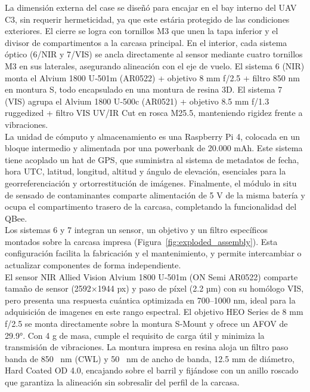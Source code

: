     \noindent La dimensión externa del case se diseñó para encajar en el bay interno del UAV C3, sin requerir hermeticidad, ya que este estária protegido de las condiciones exteriores. El cierre se logra con tornillos M3 que unen la tapa inferior y el divisor de compartimentos a la carcasa principal. En el interior, cada sistema óptico (6/NIR y 7/VIS) se ancla directamente al sensor mediante cuatro tornillos M3 en sus laterales, asegurando alineación con el eje de vuelo. El sistema 6 (NIR) monta el Alvium 1800 U‑501m (AR0522) + objetivo 8 mm f/2.5 + filtro 850 nm en montura S, todo encapsulado en una montura de resina 3D. El sistema 7 (VIS) agrupa el Alvium 1800 U‑500c (AR0521) + objetivo 8.5 mm f/1.3 ruggedized + filtro VIS UV/IR Cut en rosca M25.5, manteniendo rigidez frente a vibraciones.\\
    
    \noindent La unidad de cómputo y almacenamiento es una Raspberry Pi 4, colocada en un bloque intermedio y alimentada por una powerbank de 20.000 mAh. Este sistema tiene acoplado un hat de GPS, que suministra al sistema de metadatos de fecha, hora UTC, latitud, longitud, altitud y ángulo de elevación, esenciales para la georreferenciación y ortorrestitución de imágenes. Finalmente, el módulo in situ de sensado de contaminantes comparte alimentación de 5 V de la misma batería y ocupa el compartimento trasero de la carcasa, completando la funcionalidad del QBee.\\
    
    



    \noindent Los sistemas 6 y 7 integran un sensor, un objetivo y un filtro específicos montados sobre la carcasa impresa (Figura~\ref{fig:exploded_assembly}). Esta configuración facilita la fabricación y el mantenimiento, y permite intercambiar o actualizar componentes de forma independiente.\\

    \noindent El sensor NIR Allied Vision Alvium 1800 U‑501m (ON Semi AR0522) comparte tamaño de sensor (2592×1944 px) y paso de píxel (2.2 µm) con su homólogo VIS, pero presenta una respuesta cuántica optimizada en 700–1000 nm, ideal para la adquisición de imagenes en este rango espectral. El objetivo HEO Series de 8 mm f/2.5 se monta directamente sobre la montura S‑Mount y ofrece un AFOV de 29.9°. Con 4 g de masa, cumple el requisito de carga útil y minimiza la transmisión de vibraciones. La montura impresa en resina aloja un filtro paso banda de 850 \SI{}{nm} (CWL) y 50 \SI{}{nm} de ancho de banda, 12.5 mm de diámetro, Hard Coated OD 4.0, encajando sobre el barril y fijándose con un anillo roscado que garantiza la alineación sin sobresalir del perfil de la carcasa.\\
    
